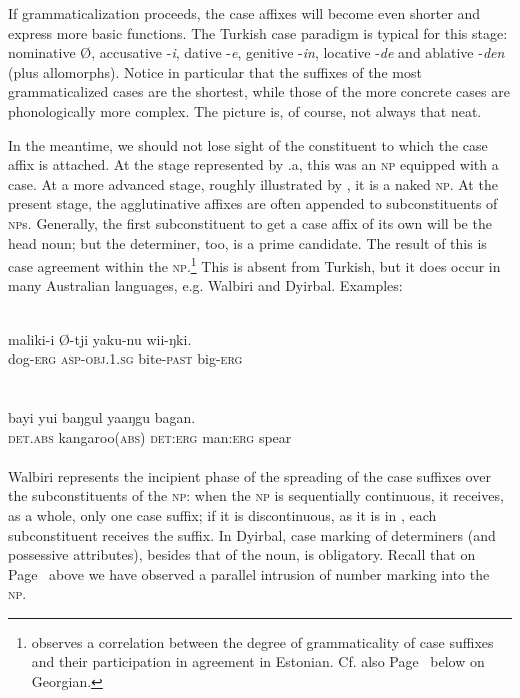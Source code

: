 If grammaticalization proceeds, the case affixes will become even shorter and express more basic functions. The Turkish case paradigm is typical for this stage: nominative Ø, accusative -\textit{i}, dative -\textit{e}, genitive -\textit{in}, locative -\textit{de} and ablative -\textit{den} (plus allomorphs). Notice in particular that the suffixes of the most grammaticalized cases are the shortest, while those of the more concrete cases are phonologically more complex. The picture is, of course, not always that neat.

In the meantime, we should not lose sight of the constituent to which the case affix is attached. At the stage represented by .a, this was an \textsc{np} equipped with a case. At a more advanced stage, roughly illustrated by , it is a naked \textsc{np}. At the present stage, the agglutinative affixes are often appended to subconstituents of \textsc{np}s. Generally, the first subconstituent to get a case affix of its own will be the head noun; but the determiner, too, is a prime candidate. The result of this is case agreement within the \textsc{np}.\footnote{\citet[117]{Kahr1976} observes a correlation between the degree of grammaticality of case suffixes and their participation in agreement in Estonian. Cf. also Page~\pageref{page101}\chkfn%
 below on Georgian.} This is absent from Turkish, but it does occur in many Australian languages, e.g. Walbiri and Dyirbal. Examples:

\ea\label{ex:E59}
\\
\gll   maliki-i  Ø-tji  yaku-nu  wii-ŋki.\\
 dog-\textsc{erg}  \textsc{asp}-\textsc{obj}.1.\textsc{sg}  bite-\textsc{past}  big-\textsc{erg}\\
\\
\z
\noindent \ea\label{ex:E60}
\\
\gll bayi  yui  baŋgul  yaaŋgu  bagan.\\
 \textsc{det}.\textsc{abs}  kangaroo(\textsc{abs})  \textsc{det}:\textsc{erg}  man:\textsc{erg}  spear\\
\\
\z
\noindent Walbiri represents the incipient phase of the spreading of the case suffixes over the subconstituents of the \textsc{np}: when the \textsc{np} is sequentially continuous, it receives, as a whole, only one case suffix; if it is discontinuous, as it is in , each subconstituent receives the suffix.\label{page92} In Dyirbal, case marking of determiners (and possessive attributes), besides that of the noun, is obligatory. Recall that on Page~\pageref{page63}\chk%
  above we have observed a parallel intrusion of number marking into the \textsc{np}.

